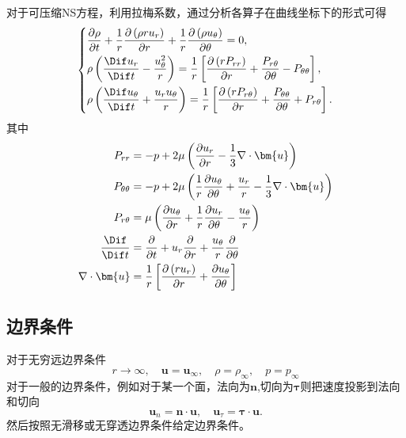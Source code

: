 \documentclass[12pt]{article}
\begin{document}
对于可压缩NS方程，利用拉梅系数，通过分析各算子在曲线坐标下的形式可得\cite[P190]{wuwangyi}
\begin{equation}
	\left\{\begin{aligned}
		 & \frac{\partial \rho}{\partial t}+\frac{1}{r} \frac{\partial\left(\rho r u_{r}\right)}{\partial r}+\frac{1}{r} \frac{\partial\left(\rho u_{\theta}\right)}{\partial \theta}=0,                                     \\
		 & \rho\left(\frac{\Dif u_{r}}{\Dif t}-\frac{u_{\theta}^{2}}{r}\right)=\frac{1}{r}\left[\frac{\partial\left(r P_{r r}\right)}{\partial r}+\frac{P_{r \theta}}{\partial \theta}-P_{\theta \theta}\right],             \\
		 & \rho\left(\frac{\Dif u_{\theta}}{\Dif t}+\frac{u_{r} u_{\theta}}{r}\right)=\frac{1}{r}\left[\frac{\partial\left(r P_{r \theta}\right)}{\partial r}+\frac{P_{\theta \theta}}{\partial \theta}+P_{r \theta}\right].
	\end{aligned}\right.
\end{equation}
其中
\begin{equation}
	\begin{aligned}
		P_{r r}             & =-p+2 \mu\left(\frac{\partial u_{r}}{\partial r}-\frac{1}{3} \nabla \cdot \bm{u}\right)                                         \\
		P_{\theta \theta}   & =-p+2 \mu\left(\frac{1}{r} \frac{\partial u_{\theta}}{\partial \theta}+\frac{u_{r}}{r}-\frac{1}{3} \nabla \cdot \bm{u}\right)   \\
		P_{r \theta}        & =\mu\left(\frac{\partial u_{\theta}}{\partial r}+\frac{1}{r} \frac{\partial u_{r}}{\partial \theta}-\frac{u_{\theta}}{r}\right) \\
		\frac{\Dif}{\Dif t} & =\frac{\partial}{\partial t}+u_{r} \frac{\partial}{\partial r}+\frac{u_{\theta}}{r} \frac{\partial}{\partial \theta}            \\
		\nabla \cdot \bm{u} & =\frac{1}{r}\left[\frac{\partial\left(r u_{r}\right)}{\partial r}+\frac{\partial u_{\theta}}{\partial \theta}\right]
	\end{aligned}
\end{equation}

\subsection{边界条件}
对于无穷远边界条件
\begin{equation}
	r \rightarrow \infty, \quad \bm{u}=\bm{u}_{\infty}, \quad \rho=\rho_{\infty}, \quad p=p_{\infty}
\end{equation}
对于一般的边界条件，例如对于某一个面，法向为$\bm{n}$,切向为$\bm{\tau}$则把速度投影到法向和切向
\begin{equation}
	\bm{u}_{n} = \bm{n}\cdot \bm{u},\quad \bm{u}_{\tau} = \bm{\tau}\cdot \bm{u}.
\end{equation}
然后按照无滑移或无穿透边界条件给定边界条件。
\end{document}
